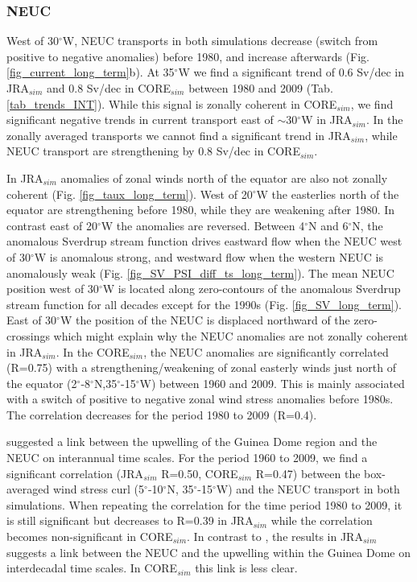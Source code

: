 \documentclass[os, manuscript]{copernicus}
\begin{document}
\subsubsection{NEUC}
West of 30$^{\circ}$W, NEUC transports in both simulations decrease (switch from positive to negative anomalies) before 1980, and increase afterwards (Fig. \ref{fig_current_long_term}b). At 35$^{\circ}$W we find a significant trend of 0.6 Sv/dec in JRA$_{sim}$ and 0.8 Sv/dec in CORE$_{sim}$ between 1980 and 2009 (Tab. \ref{tab_trends_INT}). While this signal is zonally coherent in CORE$_{sim}$, we find significant negative trends in current transport east of $\sim$30$^{\circ}$W in JRA$_{sim}$. In the zonally averaged transports we cannot find a significant trend in JRA$_{sim}$, while NEUC transport are strengthening by 0.8 Sv/dec in CORE$_{sim}$.

In JRA$_{sim}$ anomalies of zonal winds north of the equator are also not zonally coherent (Fig. \ref{fig_taux_long_term}). West of 20$^{\circ}$W the easterlies north of the equator are strengthening before 1980, while they are weakening after 1980. In contrast east of 20$^{\circ}$W the anomalies are reversed. Between 4$^{\circ}$N and 6$^{\circ}$N, the anomalous Sverdrup stream function drives eastward flow when the NEUC west of 30$^{\circ}$W is anomalous strong, and westward flow when the western NEUC is anomalously weak (Fig. \ref{fig_SV_PSI_diff_ts_long_term}). The mean NEUC position west of 30$^{\circ}$W is located along zero-contours of the anomalous Sverdrup stream function for all decades except for the 1990s (Fig. \ref{fig_SV_long_term}). East of 30$^{\circ}$W the position of the NEUC is displaced northward of the zero-crossings which might explain why the NEUC anomalies are not zonally coherent in JRA$_{sim}$. In the CORE$_{sim}$, the NEUC anomalies are significantly correlated  (R=0.75) with a strengthening/weakening of zonal easterly winds just north of the equator (2$^{\circ}$-8$^{\circ}$N,35$^{\circ}$-15$^{\circ}$W) between 1960 and 2009. This is mainly associated with a switch of positive to negative zonal wind stress anomalies before 1980s. The correlation decreases for the period 1980 to 2009 (R=0.4). 

\cite{Goes2013} suggested a link between the upwelling of the Guinea Dome region and the NEUC on interannual time scales. For the period 1960 to 2009, we find a significant correlation (JRA$_{sim}$ R=0.50, CORE$_{sim}$ R=0.47) between the box-averaged wind stress curl (5$^{\circ}$-10$^{\circ}$N, 35$^{\circ}$-15$^{\circ}$W) and the NEUC transport in both simulations. When repeating the correlation for the time period 1980 to 2009, it is still significant but decreases to R=0.39 in JRA$_{sim}$ while the correlation becomes non-significant in CORE$_{sim}$. In contrast to \cite{Goes2013}, the results in JRA$_{sim}$ suggests a link between the NEUC and the upwelling within the Guinea Dome on interdecadal time scales. In CORE$_{sim}$ this link is less clear.
\end{document}
